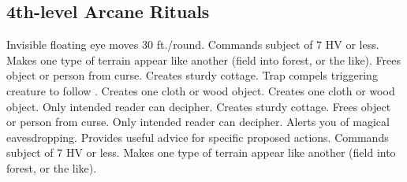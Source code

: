 \subsection{4th-level Arcane Rituals}
\begin{rituallist}
 Invisible floating eye moves 30 ft./round.
 Commands subject of 7 HV or less.
 Makes one type of terrain appear like another (field into forest, or the like).
 Frees object or person from curse.
 Creates sturdy cottage.
 Trap compels triggering creature to follow .
 Creates one cloth or wood object.
 Creates one cloth or wood object.
 Only intended reader can decipher.
 Creates sturdy cottage.
 Frees object or person from curse.
 Only intended reader can decipher.
 Alerts you of magical eavesdropping.
 Provides useful advice for specific proposed actions.
 Commands subject of 7 HV or less.
 Makes one type of terrain appear like another (field into forest, or the like).
\end{rituallist}

